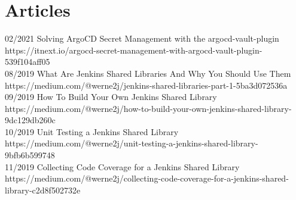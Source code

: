 \documentclass[]{friggeri-cv} %
\begin{document}
\section{Articles}

\begin{entrylist}
\entry
{02/2021}
{Solving ArgoCD Secret Management with the argocd-vault-plugin}
{}
{https://itnext.io/argocd-secret-management-with-argocd-vault-plugin-539f104aff05}\\

\entry
{08/2019}
{What Are Jenkins Shared Libraries And Why You Should Use Them}
{}
{https://medium.com/@werne2j/jenkins-shared-libraries-part-1-5ba3d072536a}\\

\entry
{09/2019}
{How To Build Your Own Jenkins Shared Library}
{}
{https://medium.com/@werne2j/how-to-build-your-own-jenkins-shared-library-9dc129db260c}\\

\entry
{10/2019}
{Unit Testing a Jenkins Shared Library}
{}
{https://medium.com/@werne2j/unit-testing-a-jenkins-shared-library-9bfb6b599748}\\

\entry
{11/2019}
{Collecting Code Coverage for a Jenkins Shared Library}
{}
{https://medium.com/@werne2j/collecting-code-coverage-for-a-jenkins-shared-library-c2d8f502732e}\\

\end{entrylist}
\end{document}
